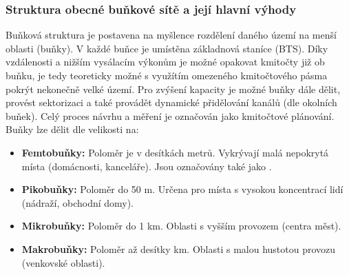 		\subsubsection{Struktura obecné buňkové sítě a její hlavní výhody}
			Buňková struktura je postavena na myšlence rozdělení daného území na menší oblasti (buňky). V každé buňce je umístěna základnová staníce (BTS). Díky vzdálenosti a nižším vysálacím výkonům je možné opakovat kmitočty již ob buňku, je tedy teoreticky možné s využítím omezeného kmitočtového pásma pokrýt nekonečně velké území. Pro zvýšení kapacity je možné buňky dále dělit, provést sektorizaci a také provádět dynamické přidělování kanálů (dle okolních buňek). Celý proces návrhu a měření je označován jako kmitočtové plánování.\\
			Buňky lze dělit dle velikosti na:
			\begin{itemize}
				\item \textbf{Femtobuňky:} Poloměr je v desítkách metrů. Vykrývají malá nepokrytá místa (domácnosti, kanceláře). Jsou označovány také jako .
				\item \textbf{Pikobuňky:} Poloměr do 50 m. Určena pro místa s vysokou koncentrací lidí (nádraží, obchodní domy).
				\item \textbf{Mikrobuňky:} Poloměr do 1 km. Oblasti s vyšším provozem (centra měst).
				\item \textbf{Makrobuňky:} Poloměr až desítky km. Oblasti s malou hustotou provozu (venkovské oblasti).
			\end{itemize}
